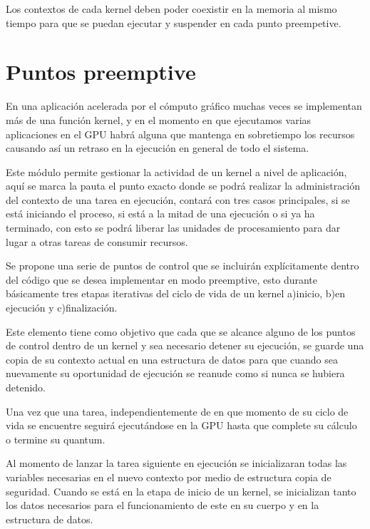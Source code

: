 Los contextos de cada kernel deben poder coexistir en la memoria al mismo tiempo para que se puedan ejecutar y suspender en cada punto preempetive.

\section{Puntos preemptive}\label{secc:puntosPreemptive}


En una aplicación acelerada por el cómputo gráfico muchas veces se implementan más de una función kernel, y en el momento en que ejecutamos varias aplicaciones en el GPU habrá alguna que mantenga en sobretiempo los recursos causando así un retraso en la ejecución en general de todo el sistema.
\newline

Este módulo permite gestionar la actividad de un kernel a nivel de aplicación, aquí se marca la pauta el punto exacto donde se podrá realizar la administración del contexto de una tarea en ejecución, contará con tres casos principales, si se está iniciando el proceso, si está a la mitad de una ejecución o si ya ha terminado, con esto se podrá liberar las unidades de procesamiento para dar lugar a otras tareas de consumir recursos.
\newline

Se propone una serie de puntos de control que se incluirán explícitamente dentro del código que se desea implementar en modo preemptive, esto durante básicamente tres etapas iterativas del ciclo de vida de un kernel a)inicio, b)en ejecución y c)finalización. 
\newline

Este elemento tiene como objetivo que cada que se alcance alguno de los puntos de control dentro de un kernel y sea necesario detener su ejecución, se guarde una copia de su contexto actual en una estructura de datos para que cuando sea nuevamente su oportunidad de ejecución se reanude como si nunca se hubiera detenido. 
\newline

Una vez que una tarea, independientemente de en que momento de su ciclo de vida se encuentre seguirá ejecutándose en la GPU hasta que complete su cálculo o termine su quantum.
\newline

Al momento de lanzar la tarea siguiente en ejecución se inicializaran todas las variables necesarias en el nuevo contexto por medio de estructura copia de seguridad. Cuando se está en la etapa de inicio de un kernel, se inicializan tanto los datos necesarios para el funcionamiento de este en su cuerpo y en la estructura de datos.
\newline

